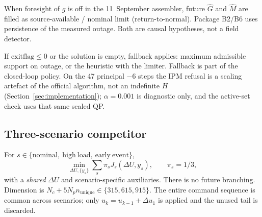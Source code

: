 \documentclass{ieeeaccess}
\begin{document}
When foresight of $g$ is off in the 11~September assembler, future $\widehat G$ and $\widehat M$ are filled as source-available / nominal limit (return-to-normal). Package B2/B6 uses persistence of the measured outage. Both are causal hypotheses, not a field detector.

If $\mathrm{exitflag}\le 0$ or the solution is empty, fallback applies: maximum admissible support on outage, or the heuristic with the limiter. Fallback is part of the closed-loop policy. On the 47 principal $-6$ steps the IPM refusal is a scaling artefact of the official algorithm, not an indefinite $H$ (Section~\ref{sec:implementation}); $\alpha=0.001$ is diagnostic only, and the active-set check uses that same scaled QP.

\subsection{Three-scenario competitor}
For $s\in\{\mathrm{nominal},\ \mathrm{high\ load},\ \mathrm{early\ event}\}$,
\begin{equation}
\min_{\Delta U,\{y_s\}}
\sum_{s}\pi_s J_s(\Delta U,y_s),
\qquad \pi_s=1/3,
\end{equation}
with a \emph{shared} $\Delta U$ and scenario-specific auxiliaries. There is no future branching. Dimension is $N_c+5N_p n_{\mathrm{unique}}\in\{315,615,915\}$. The entire command sequence is common across scenarios; only $u_k=u_{k-1}+\Delta u_1$ is applied and the unused tail is discarded.
\end{document}
